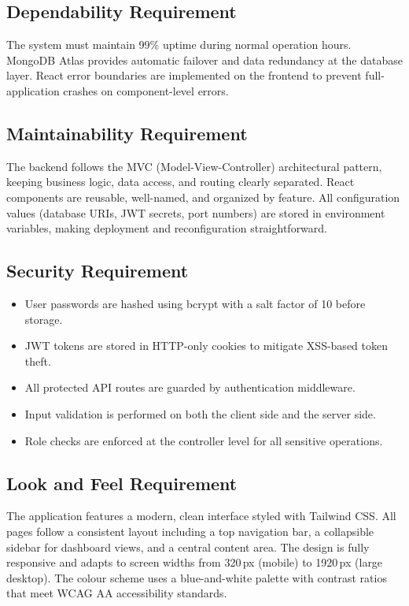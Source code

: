 \documentclass[12pt, a4paper, oneside]{report}
\begin{document}
\subsection{Dependability Requirement}

The system must maintain 99\% uptime during normal operation hours. MongoDB Atlas provides automatic failover and data redundancy at the database layer. React error boundaries are implemented on the frontend to prevent full-application crashes on component-level errors.

\subsection{Maintainability Requirement}

The backend follows the MVC (Model-View-Controller) architectural pattern, keeping business logic, data access, and routing clearly separated. React components are reusable, well-named, and organized by feature. All configuration values (database URIs, JWT secrets, port numbers) are stored in environment variables, making deployment and reconfiguration straightforward.

\subsection{Security Requirement}

\begin{itemize}[leftmargin=1.5cm, itemsep=2pt]
  \item User passwords are hashed using bcrypt with a salt factor of 10 before storage.
  \item JWT tokens are stored in HTTP-only cookies to mitigate XSS-based token theft.
  \item All protected API routes are guarded by authentication middleware.
  \item Input validation is performed on both the client side and the server side.
  \item Role checks are enforced at the controller level for all sensitive operations.
\end{itemize}

\subsection{Look and Feel Requirement}

The application features a modern, clean interface styled with Tailwind CSS. All pages follow a consistent layout including a top navigation bar, a collapsible sidebar for dashboard views, and a central content area. The design is fully responsive and adapts to screen widths from 320\,px (mobile) to 1920\,px (large desktop). The colour scheme uses a blue-and-white palette with contrast ratios that meet WCAG AA accessibility standards.
\end{document}
